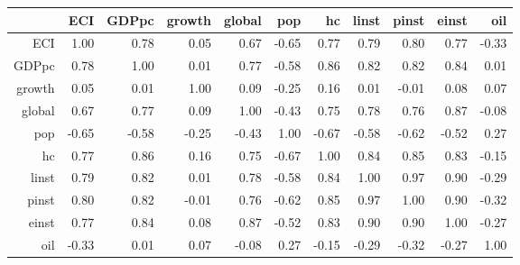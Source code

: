 \begin{table}[ht]
\centering
\begin{tabular}{rrrrrrrrrrr}
  \toprule
 & ECI & GDPpc & growth & global & pop & hc & linst & pinst & einst & oil \\ 
  \midrule
ECI & 1.00 & 0.78 & 0.05 & 0.67 & -0.65 & 0.77 & 0.79 & 0.80 & 0.77 & -0.33 \\ 
  GDPpc & 0.78 & 1.00 & 0.01 & 0.77 & -0.58 & 0.86 & 0.82 & 0.82 & 0.84 & 0.01 \\ 
  growth & 0.05 & 0.01 & 1.00 & 0.09 & -0.25 & 0.16 & 0.01 & -0.01 & 0.08 & 0.07 \\ 
  global & 0.67 & 0.77 & 0.09 & 1.00 & -0.43 & 0.75 & 0.78 & 0.76 & 0.87 & -0.08 \\ 
  pop & -0.65 & -0.58 & -0.25 & -0.43 & 1.00 & -0.67 & -0.58 & -0.62 & -0.52 & 0.27 \\ 
  hc & 0.77 & 0.86 & 0.16 & 0.75 & -0.67 & 1.00 & 0.84 & 0.85 & 0.83 & -0.15 \\ 
  linst & 0.79 & 0.82 & 0.01 & 0.78 & -0.58 & 0.84 & 1.00 & 0.97 & 0.90 & -0.29 \\ 
  pinst & 0.80 & 0.82 & -0.01 & 0.76 & -0.62 & 0.85 & 0.97 & 1.00 & 0.90 & -0.32 \\ 
  einst & 0.77 & 0.84 & 0.08 & 0.87 & -0.52 & 0.83 & 0.90 & 0.90 & 1.00 & -0.27 \\ 
  oil & -0.33 & 0.01 & 0.07 & -0.08 & 0.27 & -0.15 & -0.29 & -0.32 & -0.27 & 1.00 \\ 
   \bottomrule
\end{tabular}
\end{table}
